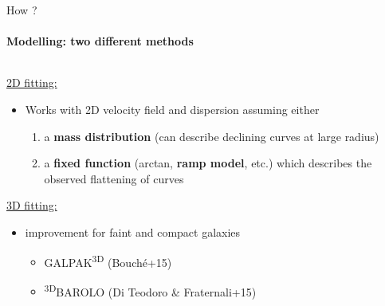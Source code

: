 \documentclass[usenames,dvipsnames]{beamer}
\begin{document}
\begin{frame}{How ?}
	\framesubtitle{Modelling: two different methods}
	\begin{columns}[T]
		\begin{column}{\linewidth}
			
			\underline{2D fitting:}
			\begin{itemize}[label=$\rhd$]
				\item Works with 2D velocity field and dispersion assuming either
				
			\begin{enumerate}[label=(\alph*)]
				\item a \textbf{mass distribution} (can describe declining curves at large radius)
				\item a \textbf{fixed function} (arctan, \textbf{ramp model}, etc.) which describes the  observed flattening of curves
			\end{enumerate}
				
			\end{itemize}
			
			\vfill
			
			\underline{3D fitting:}
			\begin{itemize}[label=$\rhd$]
				\item improvement for faint and compact galaxies
				
				\begin{itemize}[label=$\circ$]
					\item GALPAK\textsuperscript{3D} (Bouché+15)
					\item \textsuperscript{3D}BAROLO (Di Teodoro \& Fraternali+15)
				\end{itemize}
			\end{itemize}		
		\end{column}
	\end{columns}
\end{frame}
\end{document}
